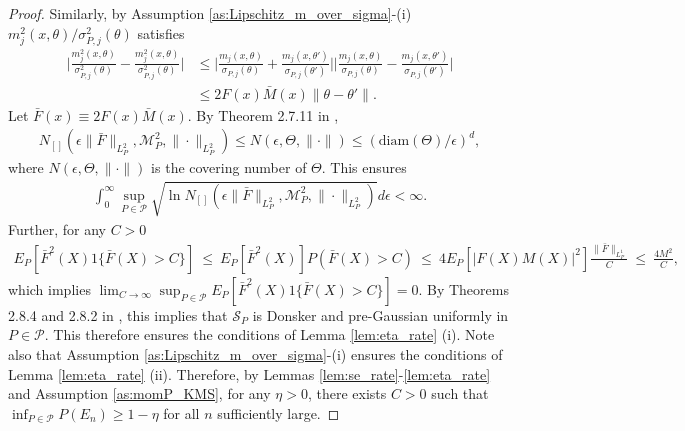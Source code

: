 \documentclass[letterpaper,11pt]{article}
\theoremstyle{myplain}
\theoremstyle{mydefinition}
\theoremstyle{myremark}
\renewcommand{\cite}{\citet}
\numberwithin{equation}{section}
\numberwithin{figure}{section}
\begin{document}
\begin{appendices}
\begin{proof}
Similarly, by Assumption \ref{as:Lipschitz_m_over_sigma}-(i) $m^2_j(x,\theta)/\sigma_{P,j}^2(\theta)$ satisfies
\begin{align}
	\Big|\frac{m^2_j(x,\theta)}{\sigma_{P,j}^2(\theta)}-\frac{m^2_j(x,\theta)}{\sigma_{P,j}^2(\theta)}\Big|&\le \Big|\frac{m_j(x,\theta)}{\sigma_{P,j}(\theta)}+\frac{m_j(x,\theta')}{\sigma_{P,j}(\theta')}\Big|\Big|\frac{m_j(x,\theta)}{\sigma_{P,j}(\theta)}-\frac{m_j(x,\theta')}{\sigma_{P,j}(\theta')}\Big|\\
	&\le 2F(x)\bar M(x)\|\theta-\theta'\|.
\end{align}
Let $\bar F(x)\equiv 2F(x)\bar M(x)$.
By Theorem 2.7.11 in \cite{Vaart_Wellner2000aBK}, 
\begin{align}
 N_{[]}(\epsilon \|\bar F\|_{L^2_P},\mathcal M^2_{P},\|\cdot\|_{L^2_P})\le N(\epsilon,\Theta,\|\cdot\|)\le (\text{diam}(\Theta)/\epsilon)^d,
\end{align}
 where $N(\epsilon,\Theta,\|\cdot\|)$ is the covering number of $\Theta$. This ensures
\begin{align}
	\int_0^\infty \sup_{P\in\mathcal P}\sqrt{\ln N_{[]}(\epsilon \|\bar F\|_{L^2_P},\mathcal M^2_{P},\|\cdot\|_{L^2_P})}d\epsilon<\infty.
\end{align}
Further, for any $C>0$ 
\begin{align}
E_P[\bar F^2(X)1\{\bar F(X)>C\}]~\le~ E_P[\bar F^2(X)]P(\bar F(X)>C)	~\le~ 4E_P[|F(X)M(X)|^2]\frac{\|\bar F\|_{L^1_P}}{C}~\le~\frac{4M^2}{C},
\end{align}
which implies $\lim_{C\to\infty}\sup_{P\in\mathcal P}E_P[\bar F^2(X)1\{\bar F(X)>C\}]=0$. By Theorems 2.8.4 and 2.8.2 in \cite{Vaart_Wellner2000aBK}, this implies that $\mathcal S_P$ is Donsker and pre-Gaussian uniformly in $P\in\mathcal P.$ This therefore ensures the conditions of Lemma \ref{lem:eta_rate} (i). Note also that Assumption \ref{as:Lipschitz_m_over_sigma}-(i) ensures the conditions of Lemma \ref{lem:eta_rate} (ii).
Therefore, by Lemmas \ref{lem:se_rate}-\ref{lem:eta_rate} and Assumption \ref{as:momP_KMS}, for any $\eta>0$, there exists $C>0$ such that $\inf_{P\in\mathcal P}P(E_n)\ge1-\eta$ for all $n$ sufficiently large.


\end{proof}
\end{appendices}
\end{document}
